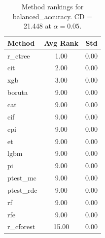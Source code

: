 \begin{table}[h]
\centering
\caption{Method rankings for balanced_accuracy. CD = 21.448 at $\alpha=0.05$.}
\label{tab:ranks_balanced_accuracy}
\begin{tabular}{lcc}
\toprule
Method & Avg Rank & Std \\
\midrule
r_ctree & 1.00 & 0.00 \\
cit & 2.00 & 0.00 \\
xgb & 3.00 & 0.00 \\
boruta & 9.00 & 0.00 \\
cat & 9.00 & 0.00 \\
cif & 9.00 & 0.00 \\
cpi & 9.00 & 0.00 \\
et & 9.00 & 0.00 \\
lgbm & 9.00 & 0.00 \\
pi & 9.00 & 0.00 \\
ptest_mc & 9.00 & 0.00 \\
ptest_rdc & 9.00 & 0.00 \\
rf & 9.00 & 0.00 \\
rfe & 9.00 & 0.00 \\
r_cforest & 15.00 & 0.00 \\
\bottomrule
\end{tabular}
\end{table}